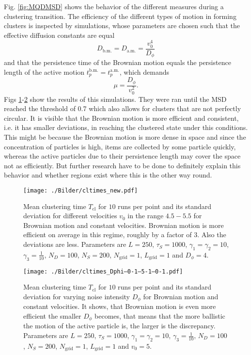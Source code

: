 Fig. \ref{fig:MQDMSD} shows the behavior of the different measures during a clustering transition. The efficiency of the different types of motion in forming clusters is inspected by simulations, whose parameters are chosen such that the effective diffusion constants are equal 
%
\begin{equation}
D_\text{b.m.} = D_\text{a.m.} = \frac{v_0^4}{D_\phi}	
\end{equation}
%
and that the persistence time of the Brownian motion equals the persistence length of the active motion $t_p^{\text{b.m.}}=t_p^{\text{a.m.}}$, which demands
%
\begin{equation}
	\mu = \frac{D_\phi}{v_0^2}.
\label{eq:muD_SD}
\end{equation}
%
Figs \ref{fig:Tcl_v}-\ref{fig:Tcl_Dphi} show the results of this simulations. They were ran until the MSD reached the threshold of 0.7 which also allows for clusters that are not perfectly circular. It is visible that the Brownian motion is more efficient and consistent, i.e. it has smaller deviations, in reaching the clustered state under this conditions. This might be because the Brownian motion is more dense in space and since the concentration of particles is high, items are collected by some particle quickly, whereas the active particles due to their persistence length may cover the space not as efficiently. But further research have to be done to definitely explain this behavior and whether regions exist where this is the other way round.

%
\begin{figure}[H]
\centering
  \texttt{[image: ./Bilder/cltimes\_new.pdf]}
\caption{Mean clustering time $T_\text{cl}$ for $10$ runs per point and its standard deviation for different velocities $v_0$ in the range $4.5-5.5$ for Brownian motion and constant velocities. Brownian motion is more efficient on average in this regime, roughly by a factor of $3$. Also the deviations are less. Parameters are $L=250$, $\tau_S=1000$, $\gamma_1=\gamma_2=10$, $\gamma_3=\frac{1}{10}$, $N_D=100$, $N_S=200$, $N_\text{grid}=1$, $L_\text{grid}=1$ and $D_\phi=4$.}
\label{fig:Tcl_v}
\end{figure}
%
\begin{figure}[H]
\centering
  \texttt{[image: ./Bilder/cltimes\_Dphi--0-1--5-1--0-1.pdf]}
\caption{Mean clustering time $T_\text{cl}$ for $10$ runs per point and its standard deviation for varying noise intensity $D_\phi$ for Brownian motion and constant velocities. It shows, that Brownian motion is even more efficient the smaller $D_\phi$ becomes, that means that the more ballistic the motion of the active particle is, the larger is the discrepancy. Parameters are $L=250$, $\tau_S=1000$, $\gamma_1=\gamma_2=10$, $\gamma_3=\frac{1}{10}$, $N_D=100$, $N_S=200$, $N_\text{grid}=1$, $L_\text{grid}=1$ and $v_0=5$.}
\label{fig:Tcl_Dphi}
\end{figure}

